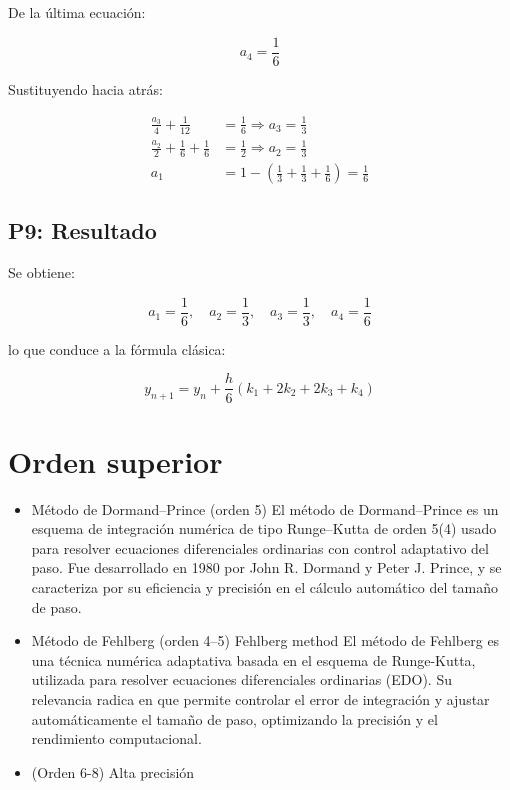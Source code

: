 \documentclass[12pt,a4paper]{article}
\begin{document}
De la última ecuación:

\begin{equation}
a_4 = \frac{1}{6}
\end{equation}

Sustituyendo hacia atrás:

\begin{align}
\frac{a_3}{4} + \frac{1}{12} &= \frac{1}{6} \Rightarrow a_3 = \frac{1}{3} \\
\frac{a_2}{2} + \frac{1}{6} + \frac{1}{6} &= \frac{1}{2} \Rightarrow a_2 = \frac{1}{3} \\
a_1 &= 1 - \left(\frac{1}{3} + \frac{1}{3} + \frac{1}{6}\right) = \frac{1}{6}
\end{align}

\subsection*{P9: Resultado}

Se obtiene:

\begin{equation}
a_1 = \frac{1}{6}, \quad a_2 = \frac{1}{3}, \quad a_3 = \frac{1}{3}, \quad a_4 = \frac{1}{6}
\end{equation}

lo que conduce a la fórmula clásica:

\begin{equation}
y_{n+1} = y_n + \frac{h}{6}(k_1 + 2k_2 + 2k_3 + k_4)
\end{equation}

\section{Orden superior}

\begin{itemize}
\item Método de Dormand–Prince (orden 5)
El método de Dormand–Prince es un esquema de integración numérica de tipo Runge–Kutta de orden 5(4) usado para resolver ecuaciones diferenciales ordinarias con control adaptativo del paso. Fue desarrollado en 1980 por John R. Dormand y Peter J. Prince, y se caracteriza por su eficiencia y precisión en el cálculo automático del tamaño de paso.

\item Método de Fehlberg (orden 4–5) 
Fehlberg method
El método de Fehlberg es una técnica numérica adaptativa basada en el esquema de Runge-Kutta, utilizada para resolver ecuaciones diferenciales ordinarias (EDO). Su relevancia radica en que permite controlar el error de integración y ajustar automáticamente el tamaño de paso, optimizando la precisión y el rendimiento computacional.

\item (Orden 6-8) Alta precisión
\end{itemize}
\end{document}
